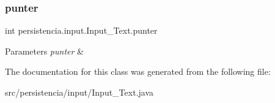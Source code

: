 \subsubsection{\texorpdfstring{punter}{punter}}
{\footnotesize\ttfamily int persistencia.\+input.\+Input\+\_\+\+Text.\+punter\hspace{0.3cm}{\ttfamily [private]}}


\begin{DoxyParams}{Parameters}
{\em punter} & \\
\hline
\end{DoxyParams}


The documentation for this class was generated from the following file\+:\begin{DoxyCompactItemize}
\item 
src/persistencia/input/Input\+\_\+\+Text.\+java\end{DoxyCompactItemize}
